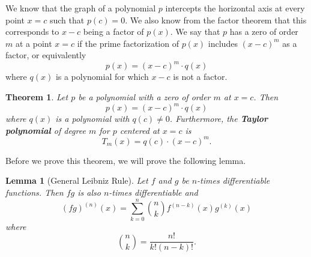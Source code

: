\documentclass[
]{book}
\newtheorem{theorem}{Theorem}[chapter]
\newtheorem{lemma}{Lemma}[chapter]
\theoremstyle{definition}
\theoremstyle{definition}
\theoremstyle{definition}
\theoremstyle{definition}
\theoremstyle{remark}
\begin{document}
We know that the graph of a polynomial \(p\) intercepts the horizontal axis at every point \(x=c\) such that \(p(c)=0\). We also know from the factor theorem that this corresponds to \(x-c\) being a factor of \(p(x)\). We say that \(p\) has a zero of order \(m\) at a point \(x=c\) if the prime factorization of \(p(x)\) includes \((x-c)^m\) as a factor, or equivalently
\[p(x)=(x-c)^m \cdot q(x)\] where \(q(x)\) is a polynomial for which \(x-c\) is not a factor.

\begin{theorem}
\protect\hypertarget{thm:poly-Taylor-zero}{}\label{thm:poly-Taylor-zero}Let \(p\) be a polynomial with a zero of order \(m\) at \(x=c\). Then \[p(x)=(x-c)^m \cdot q(x)\] where \(q(x)\) is a polynomial with \(q(c)\neq 0\). Furthermore, the \textbf{Taylor polynomial} of degree \(m\) for \(p\) centered at \(x=c\) is \[T_m(x)= q(c)\cdot (x-c)^m.\]
\end{theorem}

Before we prove this theorem, we will prove the following lemma.

\begin{lemma}[General Leibniz Rule]
\protect\hypertarget{lem:Leibniz-rule}{}\label{lem:Leibniz-rule}Let \(f\) and \(g\) be \(n\)-times differentiable functions. Then \(fg\) is also \(n\)-times differentiable and
\[(fg)^{(n)} (x) = \sum_{k=0}^n \binom{n}{k} f^{(n-k)}(x) g^{(k)}(x) \] where \[\binom{n}{k} = \frac{n!}{k!(n-k)!}.\]
\end{lemma}
\end{document}
